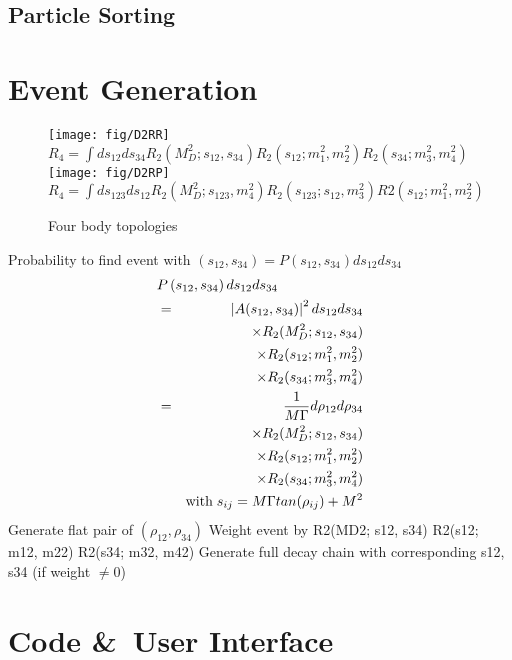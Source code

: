 \documentclass[a4paper, twocolumn]{article}
\begin{document}
\subsection{Particle Sorting}


\section{Event Generation}

\begin{figure}
\caption{Four body topologies}
\texttt{[image: fig/D2RR]}
\\
\(
R_4 = \int ds_{12} ds_{34}  R_2(M_D^2; s_{12}, s_{34}) R_2(s_{12}; m_1^2, m_2^2) R_2(s_{34}; m_3^2, m_4^2)
\) 
\\
\texttt{[image: fig/D2RP]}
\\
\(
R_4 = \int ds_{123} ds_{12} R_2(M_D^2; s_{123}, m_4^2) R_2(s_{123}; s_{12}, m_3^2) R2(s_{12}; m_1^2, m_2^2)
\)
\end{figure}

Probability to find event with 
\( (s_{12}, s_{34}) = P( s_{12}, s_{34}) ds_{12} ds_{34} \)
\begin{eqnarray}
 \lefteqn{P\left( s_{12}, s_{34}\right) ds_{12} ds_{34}} \nonumber\\
   &=& \left|A ( s_{12}, s_{34})\right|^2 ds_{12}  ds_{34}   \nonumber
   \\ && \times R_2(M_D^2; s_{12}, s_{34}) \nonumber
   \\ && \times R_2(s_{12}; m_1^2, m_2^2) \nonumber
   \\ && \times R_2(s_{34}; m_3^2, m_4^2) \nonumber
\\
   &=&   
   \frac{1}{M\Gamma} d\rho_{12} d\rho_{34}  \nonumber
   \\ && \times    R_2(M_D^2; s_{12}, s_{34}) \nonumber
   \\ && \times    R_2(s_{12}; m_1^2, m_2^2) \nonumber
   \\ && \times    R_2(s_{34}; m_3^2, m_4^2) \nonumber
\\ 
    && \mbox{with}\; s_{ij} = M\Gamma tan(\rho_{ij}) + M^2 \nonumber \\
\end{eqnarray}
Generate flat pair of $(\rho_{12}, \rho_{34})$
 Weight event by R2(MD2; s12, s34) R2(s12; m12, m22) R2(s34; m32, m42)
Generate full decay chain with corresponding s12, s34 (if weight $\neq 0$)


\section{Code \&\ User Interface}
\end{document}

